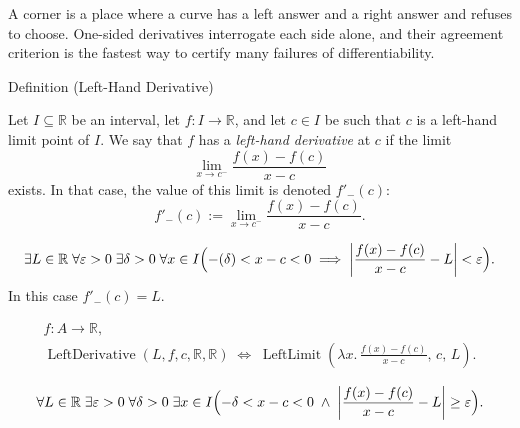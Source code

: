 
\begin{remark*}[Interpretation]
A corner is a place where a curve has a left answer and a right answer and
refuses to choose. One-sided derivatives interrogate each side alone, and
their agreement criterion is the fastest way to certify many failures of
differentiability.
\end{remark*}

\begin{definitionbox}{Definition (Left-Hand Derivative)}
\begin{definition}
\label{def:left-hand-derivative}
Let $I \subseteq \mathbb{R}$ be an interval, let $f : I \to \mathbb{R}$, and let $c \in I$ be such that $c$ is a left-hand limit point of $I$. We say that $f$ has a \emph{left-hand derivative} at $c$ if the limit
\[
\lim_{x \to c^-} \frac{f(x) - f(c)}{x - c}
\]
exists. In that case, the value of this limit is denoted $f'_-(c)$:
\[
f'_-(c) := \lim_{x \to c^-} \frac{f(x) - f(c)}{x - c}.
\]
\end{definition}
\end{definitionbox}

\begin{remark*}
\[
\exists L \in \mathbb{R}\;\forall \varepsilon > 0\;\exists \delta > 0\;\forall x \in I
\Bigl(-({\delta}) < x - c < 0 \implies \left|\frac{f(x)-f(c)}{x-c} - L\right| < \varepsilon\Bigr).
\]
In this case $f'_-(c) = L$.
\end{remark*}

\begin{remark*}
\[
\begin{aligned}
  f\colon A\to\mathbb{R},\\
\operatorname{LeftDerivative}(L,f,c,\mathbb{R},\mathbb{R})
\;\Longleftrightarrow\;
\operatorname{LeftLimit}\!\left(\lambda x.\,\frac{f(x)-f(c)}{x-c},\, c,\, L\right).
\end{aligned}
\]
\end{remark*}

\begin{remark*}
\[
\forall L \in \mathbb{R}\;\exists \varepsilon > 0\;\forall \delta > 0\;\exists x \in I
\Bigl(-\delta < x - c < 0 \;\land\; \left|\frac{f(x)-f(c)}{x-c} - L\right| \ge \varepsilon\Bigr).
\]
\end{remark*}

